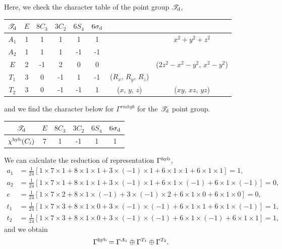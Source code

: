 \documentclass[a4paper]{book}
\begin{document}
\begin{solution}
		Here, we check the character table of the point group $\mathscr{T}_{\rm d}$, \vspace{-0.5em}
		\begin{center}
		\begin{tabular}{cccccccc}\hline
	$\mathscr{T}_{\rm d}$ & $E$ & $8C_3$ &	$3C_2$	& $6S_4$	&	$6\sigma_{\rm d}$ &		&	\\ \hline
		$A_1$	&	1	&	1	&	1	&	1	&	1	&	& $x^2+y^2+z^2$	\\
		$A_2$	&	1	&	1	&	1	&	-1	&	-1	&	&	\\
		$E$		&	2	&	-1	&	2	&	0	&	0	&	& ($2z^2-x^2-y^2$, $x^2-y^2$)	\\
		$T_1$	&	3	&	0	&	-1	&	1	&	-1	& ($R_x$, $R_y$, $R_z$)	& 	\\
		$T_2$	&	3	&	0	&	-1	&	-1	&	1	& ($x$, $y$, $z$)	&	($xy$, $xz$, $yz$) 	\\ \hline
		\end{tabular}
		\end{center}
		and we find the character below for $\Gamma^{rm hyb}$ for the $\mathscr{T}_{\rm d}$ point group.
		\begin{center}
		\begin{tabular}{cccccc} \hline
			$\mathscr{T}_{\rm d}$ & $E$ & $8C_3$ &	$3C_2$	& $6S_4$	&	$6\sigma_{\rm d}$	\\ \hline
			$\chi^{\rm hyb}(C_i)$ & 7 & 1 & -1 & 1 & 1 \\\hline
		\end{tabular}
		\end{center}
		
		We can calculate the reduction of representation $\Gamma^{\rm hyb}$,
		\begin{align*}
		a_1 &= \frac{1}{24} [ 1 \times 7 \times 1 + 8 \times 1 \times 1 + 3 \times (-1) \times 1 + 6 \times 1 \times 1 + 6 \times 1 \times 1 ] = 1 ,\\
		a_2 &= \frac{1}{24} [ 1 \times 7 \times 1 + 8 \times 1 \times 1 + 3 \times (-1) \times 1 + 6 \times 1 \times (-1) + 6 \times 1 \times (-1) ] = 0, \\
		e &= \frac{1}{24} [ 1 \times 7 \times 2 + 8 \times 1 \times (-1) + 3 \times (-1) \times 2 + 6 \times 1 \times 0 + 6 \times 1 \times 0 ] = 0, \\
		t_1 &= \frac{1}{24} [ 1 \times 7 \times 3 + 8 \times 1 \times 0 + 3 \times (-1) \times (-1) + 6 \times 1 \times 1 + 6 \times 1 \times (-1) ] = 1 ,\\
		t_2 &= \frac{1}{24} [ 1 \times 7 \times 3 + 8 \times 1 \times 0 + 3 \times (-1) \times (-1) + 6 \times 1 \times (-1) + 6 \times 1 \times 1 ] = 1 ,
		\end{align*}
		and we obtain
		\begin{equation}
			\Gamma^{\rm hyb} = \Gamma^{A_1} \oplus \Gamma^{T_1} \oplus \Gamma^{T_2}.
		\end{equation}
		

\end{solution}
\end{document}
